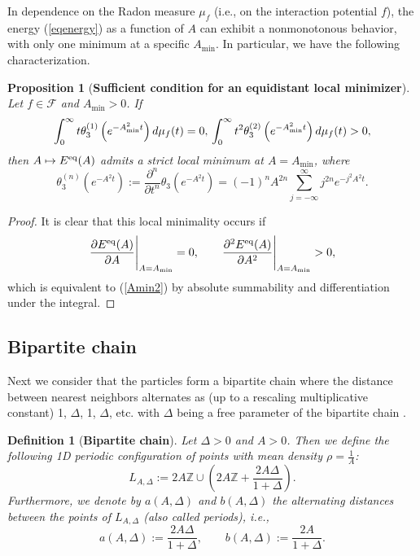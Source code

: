 \documentclass[12pt]{iopart}
\newtheorem{defi}{Definition}[section]
\newtheorem{prop}[thm]{Proposition}
\theoremstyle{definition}
\newcommand{\Z}{\mathbb Z}
\begin{document}
In dependence on the Radon measure $\mu_f$ (i.e., on the interaction
potential $f$), the energy (\ref{eqenergy}) as a function of $A$ can exhibit
a nonmonotonous behavior, with only one minimum at a specific $A_{\min}$.
In particular, we have the following characterization.

\begin{prop}[\textbf{Sufficient condition for an equidistant local minimizer}]
Let $f\in \mathcal{F}$ and $A_{\min}>0$. If
\begin{equation} \label{Amin2}
\int_0^{\infty} t \theta_3^{(1)}\left( e^{-A_{\min}^2 t}\right)
d\mu_f(t) = 0 , \nonumber \\ \int_0^{\infty} t^2
\theta_3^{(2)}\left( e^{-A_{\min}^2 t}\right) d\mu_f(t) > 0 , 
\end{equation}  
then $A\mapsto E^{\rm eq}(A)$ admits a strict local minimum at $A=A_{\min}$,
where
\begin{equation}
\theta_3^{(n)}\left( e^{-A^2t}\right):=
\frac{\partial^n}{\partial t^n} \theta_3\left( e^{-A^2 t} \right)
= (-1)^n A^{2n} \sum_{j=-\infty}^{\infty} j^{2n} e^{-j^2 A^2 t}. 
\end{equation}
\end{prop}
\begin{proof}
It is clear that this local minimality occurs if
\begin{equation} \label{Amin1}
\frac{\partial E^{\rm eq}(A)}{\partial A} \Bigg\vert_{A=A_{\min}} = 0 , \qquad
\frac{\partial^2 E^{\rm eq}(A)}{\partial A^2} \Bigg\vert_{A=A_{\min}} > 0,
\end{equation}
which is equivalent to (\ref{Amin2}) by absolute summability and
differentiation under the integral.
\end{proof}

\subsection{Bipartite chain} \label{Sec22}
Next we consider that the particles form a bipartite chain where
the distance between nearest neighbors alternates as (up to a rescaling
multiplicative constant) 1, $\Delta$, 1, $\Delta$, etc. with
$\Delta$ being a free parameter of the bipartite chain \cite{Betermin23b}. 

\begin{defi}[\textbf{Bipartite chain}]
Let $\Delta>0$ and $A>0$.
Then we define the following 1D periodic configuration of points with
mean density $\rho = \frac{1}{A}$:
$$
L_{A,\Delta}:=2A\Z \cup \left( 2A\Z + \frac{2A\Delta}{1+\Delta}\right).
$$
Furthermore, we denote by $a(A,\Delta)$ and $b(A,\Delta)$ the alternating distances between the points of $L_{A,\Delta}$ (also called periods), i.e.,
\begin{equation} \label{periods}
a(A,\Delta) := \frac{2A\Delta}{1+\Delta} ,
\qquad b(A,\Delta) := \frac{2A}{1+\Delta} . 
\end{equation}
\end{defi}
\end{document}
